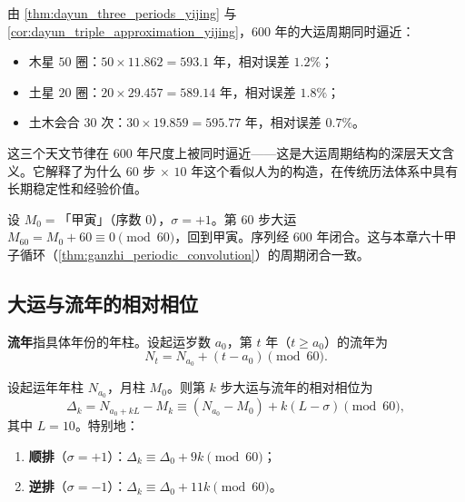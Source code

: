 \begin{remark}[$600$ 年周期作为天文逼近的联合锁定]\label{rem:dayun_600_year_yijing}
由 \cref{thm:dayun_three_periods_yijing} 与 \cref{cor:dayun_triple_approximation_yijing}，$600$ 年的大运周期同时逼近：
\begin{itemize}
    \item 木星 $50$ 圈：$50\times 11.862=593.1$ 年，相对误差 $1.2\%$；
    \item 土星 $20$ 圈：$20\times 29.457=589.14$ 年，相对误差 $1.8\%$；
    \item 土木会合 $30$ 次：$30\times 19.859=595.77$ 年，相对误差 $0.7\%$。
\end{itemize}
这三个天文节律在 $600$ 年尺度上被同时逼近——这是大运周期结构的深层天文含义。它解释了为什么 $60$ 步 $\times$ $10$ 年这个看似人为的构造，在传统历法体系中具有长期稳定性和经验价值。
\end{remark}

\begin{example}[大运序列的周期闭合实例]\label{ex:dayun_period_closure_yijing}
设 $M_0=$「甲寅」（序数 $0$），$\sigma=+1$。第 $60$ 步大运 $M_{60}=M_0+60\equiv 0\pmod{60}$，回到甲寅。序列经 $600$ 年闭合。这与本章六十甲子循环（\cref{thm:ganzhi_periodic_convolution}）的周期闭合一致。
\end{example}

\subsection{大运与流年的相对相位}

\begin{definition}[流年]\label{def:liunian_yijing}
\textbf{流年}指具体年份的年柱。设起运岁数 $a_0$，第 $t$ 年（$t\ge a_0$）的流年为
\[
N_t=N_{a_0}+(t-a_0)\pmod{60}.
\]
\end{definition}

\begin{proposition}[大运与流年的相对相位]\label{prop:dayun_liunian_phase_yijing}
设起运年年柱 $N_{a_0}$，月柱 $M_0$。则第 $k$ 步大运与流年的相对相位为
\[
\Delta_k=N_{a_0+kL}-M_k\equiv (N_{a_0}-M_0)+k(L-\sigma)\pmod{60},
\]
其中 $L=10$。特别地：
\begin{enumerate}[label=(\roman*)]
    \item \textbf{顺排}（$\sigma=+1$）：$\Delta_k\equiv\Delta_0+9k\pmod{60}$；
    \item \textbf{逆排}（$\sigma=-1$）：$\Delta_k\equiv\Delta_0+11k\pmod{60}$。
\end{enumerate}
\end{proposition}

